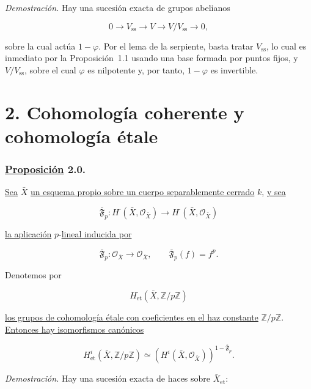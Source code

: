 \medskip
\noindent\emph{Demostración.}
Hay una sucesión exacta de grupos abelianos

\[
0\longrightarrow V_{\mathrm{ss}}\longrightarrow V
\longrightarrow V/V_{\mathrm{ss}}\longrightarrow0,
\]

\pageoriginale

sobre la cual actúa $1-\varphi$. Por el lema de la serpiente, basta tratar
$V_{\mathrm{ss}}$, lo cual es inmediato por la Proposición~1.1 usando una
base formada por puntos fijos, y $V/V_{\mathrm{ss}}$, sobre el cual
$\varphi$ es nilpotente y, por tanto, $1-\varphi$ es invertible.

\section*{2. Cohomología coherente y cohomología étale}

\subsubsection*{\underline{Proposición} 2.0.}
\underline{Sea} $\bar X$ \underline{un esquema propio sobre un cuerpo separablemente cerrado} $k$,
\underline{y sea}

\begin{equation}\tag{2.0.1}
\overline{\mathfrak F}_p:H^{\cdot}(\bar X,\mathcal O_{\bar X})
\longrightarrow H^{\cdot}(\bar X,\mathcal O_{\bar X})
\end{equation}

\underline{la aplicación} $p$-\underline{lineal inducida por}

\begin{equation}\tag{2.0.2}
\overline{\mathfrak F}_p:\mathcal O_{\bar X}\longrightarrow\mathcal O_{\bar X},
\qquad \overline{\mathfrak F}_p(f)=f^p.
\end{equation}

Denotemos por

\[
H^{\cdot}_{\mathrm{et}}(\bar X,\mathbb Z/p\mathbb Z)
\]

\underline{los grupos de cohomología étale con coeficientes en el haz constante}
$\mathbb Z/p\mathbb Z$. \underline{Entonces hay isomorfismos canónicos}

\begin{equation}\tag{2.0.3}
H^i_{\mathrm{et}}(\bar X,\mathbb Z/p\mathbb Z)
\simeq
(H^i(\bar X,\mathcal O_{\bar X}))^{1-\overline{\mathfrak F}_p}.
\end{equation}

\medskip
\noindent\emph{Demostración.}
Hay una sucesión exacta de haces sobre $\bar X_{\mathrm{et}}$:

